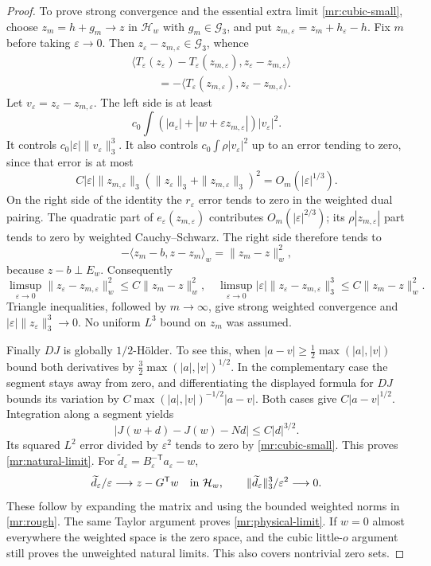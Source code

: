 \begin{proof}
To prove strong convergence and the essential extra limit
\eqref{mr:cubic-small}, choose $z_m=h+g_m\to z$ in $\mathcal H_w$
with $g_m\in\mathcal G_3$, and put
$z_{m,\varepsilon}=z_m+h_\varepsilon-h$. Fix $m$ before taking
$\varepsilon\to0$. Then
$z_\varepsilon-z_{m,\varepsilon}\in\mathcal G_3$, whence
\begin{align*}
 &\langle T_\varepsilon(z_\varepsilon)
                 -T_\varepsilon(z_{m,\varepsilon}),
                     z_\varepsilon-z_{m,\varepsilon}\rangle\\
 &\hspace{1cm}=-\langle T_\varepsilon(z_{m,\varepsilon}),
                     z_\varepsilon-z_{m,\varepsilon}\rangle.
\end{align*}
Let $v_\varepsilon=z_\varepsilon-z_{m,\varepsilon}$.
The left side is at least
\[
 c_0\int(|a_\varepsilon|+|w+\varepsilon z_{m,\varepsilon}|)
                    |v_\varepsilon|^2.
\]
It controls $c_0|\varepsilon|\|v_\varepsilon\|_3^3$. It also
controls $c_0\int\rho|v_\varepsilon|^2$ up to an error tending to zero,
since that error is at most
\[
 C|\varepsilon|\|z_{m,\varepsilon}\|_3
            (\|z_\varepsilon\|_3+\|z_{m,\varepsilon}\|_3)^2
              =O_m(|\varepsilon|^{1/3}).
\]
On the right side of the identity the $r_\varepsilon$ error tends to zero
in the weighted dual pairing. The quadratic part of
$e_\varepsilon(z_{m,\varepsilon})$ contributes
$O_m(|\varepsilon|^{2/3})$; its $\rho|z_{m,\varepsilon}|$ part tends
to zero by weighted Cauchy--Schwarz. The right side therefore tends to
\[
 -\langle z_m-b,z-z_m\rangle_w=\|z_m-z\|_w^2,
\]
because $z-b\perp E_w$. Consequently
\[
 \limsup_{\varepsilon\to0}\|z_\varepsilon-z_{m,\varepsilon}\|_w^2
   \le C\|z_m-z\|_w^2,
 \quad
 \limsup_{\varepsilon\to0}|\varepsilon|
                \|z_\varepsilon-z_{m,\varepsilon}\|_3^3
   \le C\|z_m-z\|_w^2.
\]
Triangle inequalities, followed by $m\to\infty$, give strong weighted
convergence and $|\varepsilon|\|z_\varepsilon\|_3^3\to0$.
No uniform $L^3$ bound on $z_m$ was assumed.

Finally $DJ$ is globally $1/2$-H\"older. To see this, when
$|a-v|\ge\frac12\max(|a|,|v|)$ bound both derivatives by
$\frac32\max(|a|,|v|)^{1/2}$. In the complementary case the segment
stays away from zero, and differentiating the displayed formula for $DJ$
bounds its variation by $C\max(|a|,|v|)^{-1/2}|a-v|$.
Both cases give $C|a-v|^{1/2}$. Integration along a segment yields
\[
 |J(w+d)-J(w)-Nd|\le C|d|^{3/2}.
\]
Its squared $L^2$ error divided by $\varepsilon^2$ tends to zero by
\eqref{mr:cubic-small}. This proves \eqref{mr:natural-limit}.
For $\widetilde d_\varepsilon=B_\varepsilon^{-\mathsf T}a_\varepsilon-w$,
\[
 \widetilde d_\varepsilon/\varepsilon
       \longrightarrow z-G^{\mathsf T}w\quad\hbox{in }\mathcal H_w,
 \qquad
 \|\widetilde d_\varepsilon\|_3^3/\varepsilon^2\longrightarrow0.
\]
These follow by expanding the matrix and using the bounded weighted norms
in \eqref{mr:rough}. The same Taylor argument proves
\eqref{mr:physical-limit}. If $w=0$ almost everywhere the weighted space
is the zero space, and the cubic little-$o$ argument still proves the
unweighted natural limits. This also covers nontrivial zero sets.
\end{proof}

